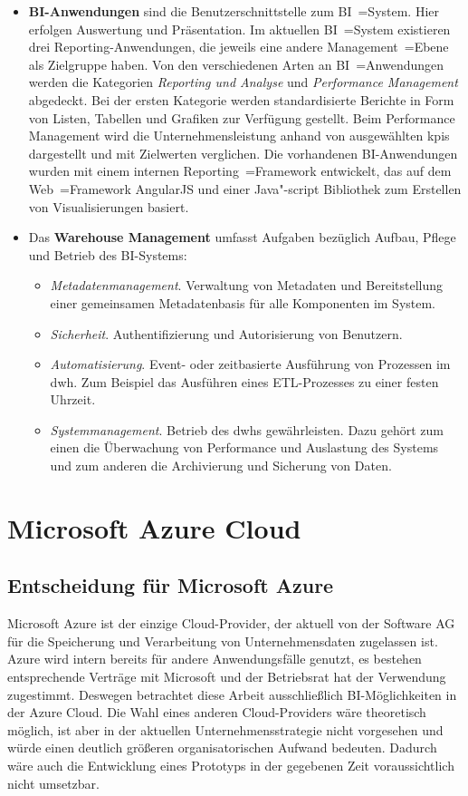 \begin{itemize}
\item \textbf{BI-Anwendungen} sind die Benutzerschnittstelle zum BI~=System. Hier erfolgen Auswertung und Präsentation. Im aktuellen BI~=System existieren drei Reporting-Anwendungen, die jeweils eine andere Management~=Ebene als Zielgruppe haben. Von den verschiedenen Arten an BI~=Anwendungen werden die Kategorien \textit{Reporting und Analyse} und \textit{Performance Management} abgedeckt. Bei der ersten Kategorie werden standardisierte Berichte in Form von Listen, Tabellen und Grafiken zur Verfügung gestellt. Beim {Performance Management} wird die Unternehmensleistung anhand von ausgewählten \acp{kpi} dargestellt und mit Zielwerten verglichen. Die vorhandenen BI-Anwendungen wurden mit einem internen Reporting~=Framework entwickelt, das auf dem Web~=Framework AngularJS und einer Java"-script Bibliothek zum Erstellen von Visualisierungen basiert.
\item Das \textbf{Warehouse Management} umfasst Aufgaben bezüglich Aufbau, Pflege und Betrieb des BI-Systems:
\begin{itemize}
\item \textit{Metadatenmanagement}. Verwaltung von Metadaten und Bereitstellung einer gemeinsamen Metadatenbasis für alle Komponenten im System.
\item \textit{Sicherheit}. Authentifizierung und Autorisierung von Benutzern.
\item \textit{Automatisierung}. Event- oder zeitbasierte Ausführung von Prozessen im \ac{dwh}. Zum Beispiel das Ausführen eines ETL-Prozesses zu einer festen Uhrzeit.
\item \textit{Systemmanagement}. Betrieb des \ac{dwh}s gewährleisten. Dazu gehört zum einen die Überwachung von Performance und Auslastung des Systems und zum anderen die Archivierung und Sicherung von Daten.
\end{itemize}
\end{itemize}

\section{Microsoft Azure Cloud} \label{sec:grundlagen:bi_in_der_cloud_mit_azure}

\subsection{Entscheidung für Microsoft Azure} \label{subsec:grundlagen:azure:entscheidungFürAzure}
Microsoft Azure ist der einzige Cloud-Provider, der aktuell von der Software AG für die Speicherung und Verarbeitung von Unternehmensdaten zugelassen ist. Azure wird intern bereits für andere Anwendungsfälle genutzt, es bestehen entsprechende Verträge mit Microsoft und der Betriebsrat hat der Verwendung zugestimmt. Deswegen betrachtet diese Arbeit ausschließlich BI-Möglichkeiten in der Azure Cloud. Die Wahl eines anderen Cloud-Providers wäre theoretisch möglich, ist aber in der aktuellen Unternehmensstrategie nicht vorgesehen und würde einen deutlich größeren organisatorischen Aufwand bedeuten. Dadurch wäre auch die Entwicklung eines Prototyps in der gegebenen Zeit voraussichtlich nicht umsetzbar.

